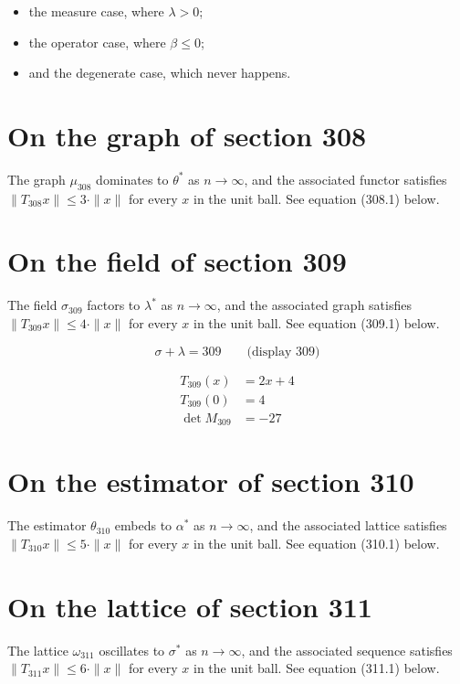 \documentclass{article}
\begin{document}
\begin{itemize}
  \item the measure case, where $\lambda > 0$;
  \item the operator case, where $\beta \leq 0$;
  \item and the degenerate case, which never happens.
\end{itemize}

\section{On the graph of section 308}
The graph $\mu_{308}$ dominates to $\theta^{*}$ as $n \to \infty$,
and the associated functor satisfies $\|T_{308} x\| \leq 3 \cdot \|x\|$
for every $x$ in the unit ball. See equation (308.1) below.

\section{On the field of section 309}
The field $\sigma_{309}$ factors to $\lambda^{*}$ as $n \to \infty$,
and the associated graph satisfies $\|T_{309} x\| \leq 4 \cdot \|x\|$
for every $x$ in the unit ball. See equation (309.1) below.

$$
\sigma + \lambda = 309 \qquad \text{(display 309)}
$$

\begin{align}
T_{309}(x) &= 2 x + 4 \\
T_{309}(0) &= 4 \\
\det M_{309} &= -27
\end{align}

\section{On the estimator of section 310}
The estimator $\theta_{310}$ embeds to $\alpha^{*}$ as $n \to \infty$,
and the associated lattice satisfies $\|T_{310} x\| \leq 5 \cdot \|x\|$
for every $x$ in the unit ball. See equation (310.1) below.

\section{On the lattice of section 311}
The lattice $\omega_{311}$ oscillates to $\sigma^{*}$ as $n \to \infty$,
and the associated sequence satisfies $\|T_{311} x\| \leq 6 \cdot \|x\|$
for every $x$ in the unit ball. See equation (311.1) below.
\end{document}
